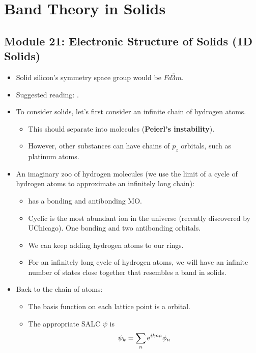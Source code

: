 \documentclass[../notes.tex]{subfiles}
\begin{document}
\chapter{Band Theory in Solids}
\section{Module 21: Electronic Structure of Solids (1D Solids)}
\begin{itemize}
    \item {}Solid silicon's symmetry space group would be $Fd\overline{3}m$.
    \item Suggested reading: \textcite{bib:bandTheory}.
    \item To consider solids, let's first consider an infinite chain of hydrogen atoms.
    \begin{itemize}
        \item This should separate into  molecules (\textbf{Peierl's instability}).
        \item However, other substances can have chains of $p_z$ orbitals, such as platinum atoms.
    \end{itemize}
    \item An imaginary zoo of hydrogen molecules (we use the limit of a cycle of hydrogen atoms to approximate an infinitely long chain):
    \begin{itemize}
        \item {} has a bonding and antibonding MO.
        \item Cyclic  is the most abundant ion in the universe (recently discovered by UChicago). One bonding and two antibonding orbitals.
        \item We can keep adding hydrogen atoms to our rings.
        \item For an infinitely long cycle of hydrogen atoms, we will have an infinite number of states close together that resembles a band in solids.
    \end{itemize}
    \item Back to the chain of  atoms:
    \begin{itemize}
        \item The basis function on each lattice point is a  orbital.
        \item The appropriate SALC $\psi$ is
        \begin{equation*}
            \psi_k = \sum_n\e[ikna]\phi_n
        \end{equation*}

\end{itemize}
\end{itemize}
\end{document}
